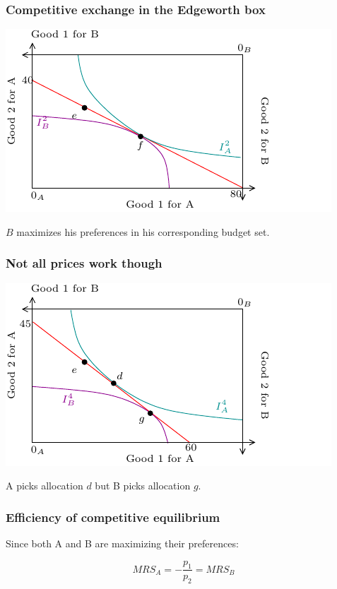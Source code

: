\documentclass[xcolor=pdftex,dvipsnames]{beamer}
\begin{document}
\begin{frame}
  \frametitle{Competitive exchange in the Edgeworth box}
  \begin{center}
    \includegraphics{pics/CompetitiveEq3}
  \end{center}
$B$ maximizes his preferences in his corresponding budget set.
\end{frame}

\begin{frame}
  \frametitle{Not all prices work though}
  \begin{center}
    \includegraphics{pics/NoCompEq}
  \end{center}
A picks allocation $d$ but B picks allocation $g$.
\end{frame}


\begin{frame}
  \frametitle{Efficiency of competitive equilibrium}
  Since both A and B are maximizing their preferences:

  \[
  MRS_A = -\frac{p_1}{p_2} = MRS_B
  \]

\bigskip





\end{frame}
\end{document}

